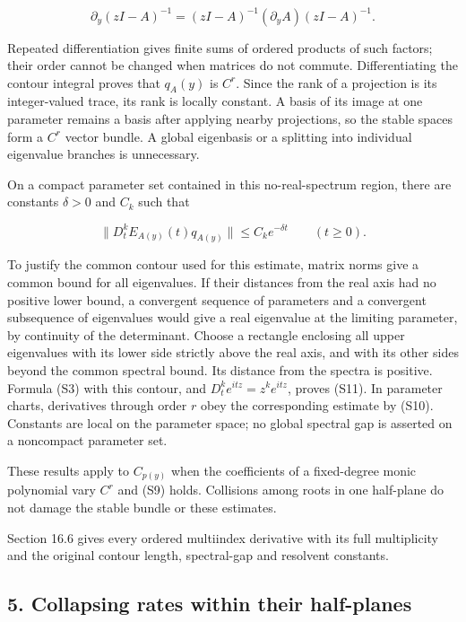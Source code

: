 \documentclass[
  11pt,
]{article}
\begin{document}
\[
\partial_y(zI-A)^{-1}
=(zI-A)^{-1}(\partial_y A)(zI-A)^{-1}.                      \tag{S10}
\]

Repeated differentiation gives finite sums of ordered products of such
factors; their order cannot be changed when matrices do not commute.
Differentiating the contour integral proves that \(q_A(y)\) is \(C^r\).
Since the rank of a projection is its integer-valued trace, its rank is
locally constant. A basis of its image at one parameter remains a basis
after applying nearby projections, so the stable spaces form a \(C^r\)
vector bundle. A global eigenbasis or a splitting into individual
eigenvalue branches is unnecessary.

On a compact parameter set contained in this no-real-spectrum region,
there are constants \(\delta>0\) and \(C_k\) such that

\[
\|D_t^k E_{A(y)}(t)q_{A(y)}\|\leq C_k e^{-\delta t}
\qquad(t\geq0).                                           \tag{S11}
\]

To justify the common contour used for this estimate, matrix norms give
a common bound for all eigenvalues. If their distances from the real
axis had no positive lower bound, a convergent sequence of parameters
and a convergent subsequence of eigenvalues would give a real eigenvalue
at the limiting parameter, by continuity of the determinant. Choose a
rectangle enclosing all upper eigenvalues with its lower side strictly
above the real axis, and with its other sides beyond the common spectral
bound. Its distance from the spectra is positive. Formula (S3) with this
contour, and \(D_t^ke^{itz}=z^ke^{itz}\), proves (S11). In parameter
charts, derivatives through order \(r\) obey the corresponding estimate
by (S10). Constants are local on the parameter space; no global spectral
gap is asserted on a noncompact parameter set.

These results apply to \(C_{p(y)}\) when the coefficients of a
fixed-degree monic polynomial vary \(C^r\) and (S9) holds. Collisions
among roots in one half-plane do not damage the stable bundle or these
estimates.

Section 16.6 gives every ordered multiindex derivative with its full
multiplicity and the original contour length, spectral-gap and resolvent
constants.

\subsection{5. Collapsing rates within their
half-planes}\label{collapsing-rates-within-their-half-planes}
\end{document}
